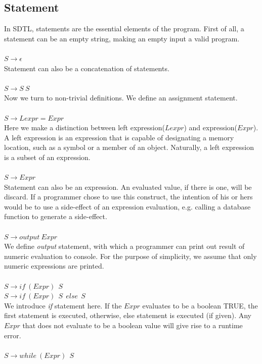 \documentclass[a4paper,12pt]{article}
\begin{document}
\subsection{Statement}
In SDTL, statements are the essential elements of the program. First of all, a statement can be an empty string, making an empty input a valid program.\\\\
$S \rightarrow \epsilon$\\
Statement can also be a concatenation of statements.\\\\
$S \rightarrow S\  S$\\
Now we turn to non-trivial definitions. We define an assignment statement.\\\\
$S \rightarrow Lexpr = Expr$\\
Here we make a distinction between left expression($Lexpr$) and expression($Expr$). A left expression is an expression that is capable of designating a memory location, such as a symbol or a member of an object. Naturally, a left expression is a subset of an expression.\\\\
$S \rightarrow Expr$\\
Statement can also be an expression. An evaluated value, if there is one, will be discard. If a programmer chose to use this construct, the intention of his or hers would be to use a side-effect of an expression evaluation, e.g. calling a database function to generate a side-effect.\\\\
$S \rightarrow output\  Expr$\\
We define \textit{output} statement, with which a programmer can print out result of numeric evaluation to console. For the purpose of simplicity, we assume that only numeric expressions are printed.\\\\
$S \rightarrow if\ (Expr)\ {\ S\ }$\\
$S \rightarrow if\ (Expr)\ {\ S\ }\ else\ {\ S\ }$\\
We introduce \textit{if} statement here. If the $Expr$ evaluates to be a boolean TRUE, the first statement is executed, otherwise, else statement is executed (if given). Any $Expr$ that does not evaluate to be a boolean value will give rise to a runtime error.\\\\
$S \rightarrow while\ (Expr)\ {\ S\ }$
\end{document}

